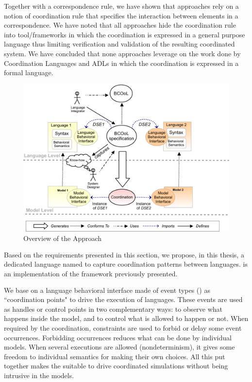 Together with a correspondence rule, we have shown that approaches rely on a notion of coordination rule that specifies the interaction between elements in a correspondence. We have noted that all approaches hide the coordination rule into tool/frameworks in which the coordination is expressed in a general purpose language thus limiting verification and validation of the resulting coordinated system. We have concluded that none approaches leverage on the work done by Coordination Languages and ADLs in which the coordination is expressed in a formal language.  

\begin{figure}
	\begin{center}
		\includegraphics[width=1\textwidth]{framework/figs/bcool}
		\caption{Overview of the Approach}
		\label{fig:bcool}
	\end{center}
\end{figure}

Based on the requirements presented in this section, we propose, in this thesis, a dedicated language named \bcool to capture coordination patterns between languages. \bcool is an implementation of the framework previously presented.  

We base on a language behavioral interface made of event types (\ie \dse\cite{sle13-combemale}) as ``coordination points" to drive the execution of languages. These events are used as handles or control points in two complementary ways: to observe what happens inside the model, and to control what is allowed to happen or not. When required by the coordination, constraints are used to forbid or delay some event occurrences. Forbidding occurrences reduces what can be done by individual models. When several executions are allowed
(nondeterminism), it gives some freedom to individual semantics for making their own choices. All this put together makes the \dse suitable to drive coordinated simulations without being intrusive in the models. 

